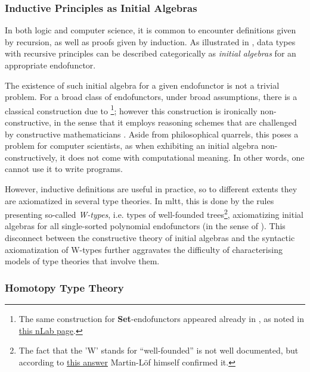 \documentclass[a4paper]{article}
\newcommand{\catname}[1]{{\normalfont\textbf{#1}}}
\newcommand{\Set}{\catname{Set}}
\begin{document}
\subsubsection{Inductive Principles as Initial Algebras}

In both logic and computer science, it is common to encounter definitions given by recursion, as well as proofs given by induction. As illustrated in \cite[Section 10.5]{Awodey2010}, data types with recursive principles can be described categorically as \textit{initial algebras} for an appropriate endofunctor.

The existence of such initial algebra for a given endofunctor is not a trivial problem. For a broad class of endofunctors, under broad assumptions, there is a classical construction due to \textcite{Adamek1974}\footnote{The same construction for \Set{}-endofunctors appeared already in \textcite{Pohlova1973}, as noted in \href{https://ncatlab.org/nlab/show/Ad\%C3\%A1mek\%27s+fixed+point+theorem}{this nLab page}.}; however this construction is ironically non-constructive, in the sense that it employs reasoning schemes that are challenged by constructive mathematicians \cite[Theorem 1.1, discussion]{Pitts2021}. Aside from philosophical quarrels, this poses a problem for computer scientists, as when exhibiting an initial algebra non-constructively, it does not come with computational meaning. In other words, one cannot use it to write programs.

However, inductive definitions are useful in practice, so to different extents they are axiomatized in several type theories. In \gls{mltt}, this is done by the rules presenting so-called \textit{W-types}, i.e. types of well-founded trees\footnote{The fact that the 'W' stands for ``well-founded'' is not well documented, but according to \href{https://mathoverflow.net/questions/402435/why-are-w-types-called-w}{this answer} Martin-Löf himself confirmed it.}, axiomatizing initial algebras for all single-sorted polynomial endofunctors (in the sense of \cite{Abbott2005}). This disconnect between the constructive theory of initial algebras and the syntactic axiomatization of W-types further aggravates the difficulty of characterising models of type theories that involve them.

\subsubsection{Homotopy Type Theory}
\end{document}
